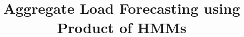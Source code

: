 \documentclass{acm_proc_article-sp}
\begin{document}
\title{Aggregate Load Forecasting using Product of HMMs}



%
%
%
%
%
\end{document}

